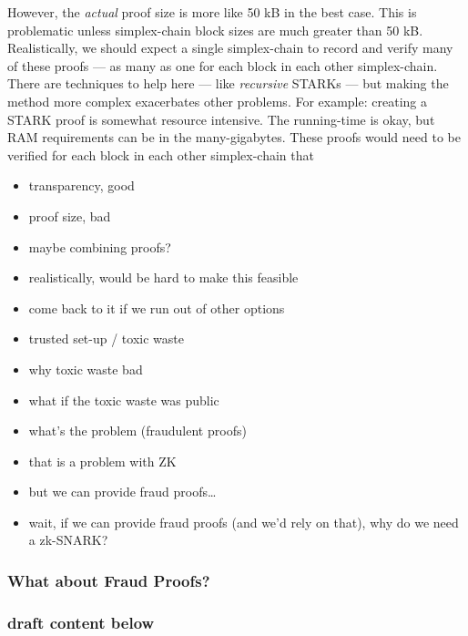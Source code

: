 \begin{draftonly}
However, the \emph{actual} proof size is more like 50 kB in the best case.
This is problematic unless simplex-chain block sizes are much greater than 50 kB.
Realistically, we should expect a single simplex-chain to record and verify many of these proofs --- as many as one for each block in each other simplex-chain.
There are techniques to help here --- like \emph{recursive} STARKs --- but making the method more complex exacerbates other problems.
For example: creating a STARK proof is somewhat resource intensive.
The running-time is okay, but RAM requirements can be in the many-gigabytes.
These proofs would need to be verified for each block in each other simplex-chain that

\begin{itemize}
    \item transparency, good
    \item proof size, bad
    \item maybe combining proofs?
    \item realistically, would be hard to make this feasible
    \item come back to it if we run out of other options
\end{itemize}


\begin{itemize}
    \item trusted set-up / toxic waste
    \item why toxic waste bad
    \item what if the toxic waste was public
    \item what's the problem (fraudulent proofs)
    \item that is a problem with ZK
    \item but we can provide fraud proofs\dots
    \item wait, if we can provide fraud proofs (and we'd rely on that), why do we need a zk-SNARK?
\end{itemize}

\subsubsection{What about Fraud Proofs?}




\subsubsection{draft content below}



\end{draftonly}
